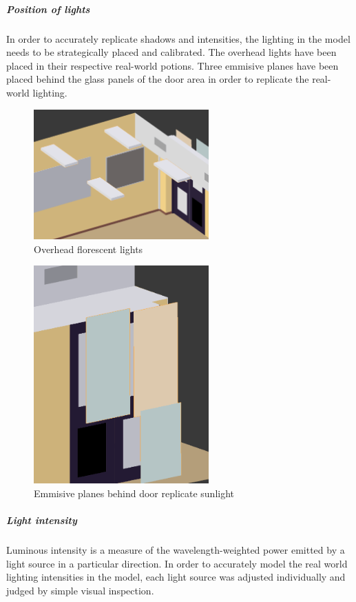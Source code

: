 \documentclass[11pt,a4paper]{report}
\begin{document}
					\subparagraph{Position of lights}
						In order to accurately replicate shadows and intensities, the lighting in the model needs to be strategically placed and calibrated. The overhead lights have been placed in their respective real-world potions. Three emmisive planes have been placed behind the glass panels of the door area in order to replicate the real-world lighting.
						
						\begin{figure}[h!]
							\centering
							\includegraphics[width=0.6\textwidth]{overhead_lights}
							\caption{Overhead florescent lights}
						\end{figure}
						\begin{figure}[h!]
							\centering
							\includegraphics[width=0.6\textwidth]{lights_behind_door}
							\caption{Emmisive planes behind door replicate sunlight}
						\end{figure}
					
					\subparagraph{Light intensity}
						Luminous intensity is a measure of the wavelength-weighted power emitted by a light source in a particular direction. In order to accurately model the real world lighting intensities in the model, each light source was adjusted individually and judged by simple visual inspection. 
						
\end{document}
